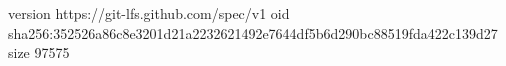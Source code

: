 version https://git-lfs.github.com/spec/v1
oid sha256:352526a86c8e3201d21a2232621492e7644df5b6d290bc88519fda422c139d27
size 97575
